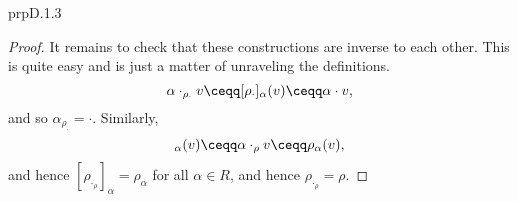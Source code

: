 \begin{thm}{}{prpD.1.3}
\begin{proof}
		\blankline
		\noindent
		It remains to check that these constructions are inverse to each other.  This is quite easy and is just a matter of unraveling the definitions.
		\begin{equation}
		\alpha \cdot _{\rho _{\cdot}}v\ceqq [\rho _{\cdot}]_{\alpha}(v)\ceqq \alpha \cdot v,
		\end{equation}
		and so $\alpha _{\rho _{\cdot}}=\cdot$.  Similarly,
		\begin{equation}
		[\rho _{\cdot _{\rho}}]_{\alpha}(v)\ceqq \alpha \cdot _{\rho}v\ceqq \rho _{\alpha}(v),
		\end{equation}
		and hence $[\rho _{\cdot _{\rho}}]_{\alpha}=\rho _{\alpha}$ for all $\alpha \in R$, and hence $\rho _{\cdot _{\rho}}=\rho$.
	\end{proof}
\end{thm}

